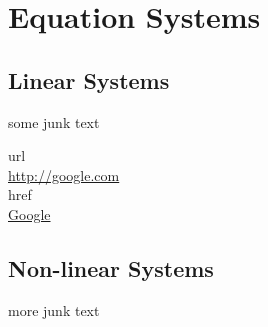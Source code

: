 \chapter{Equation Systems}
\section{Linear Systems}
some junk text

url\\
\url{http://google.com}\\

href\\
\href{http://google.com}{Google}\\

\section{Non-linear Systems}
more junk text